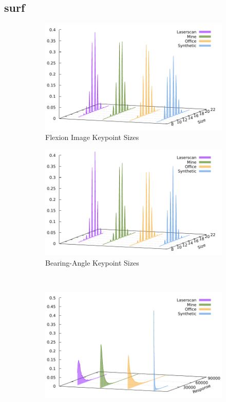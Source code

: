 \subsection{\acrshort{surf}}
\begin{figure}[H]
\begin{subfigure}[t]{0.45\linewidth}
    \includegraphics[width=\linewidth]{chapter06/results/SURF/flexion/size.pdf}%
    \caption{Flexion Image Keypoint Sizes}
\end{subfigure}\quad
\begin{subfigure}[t]{0.45\linewidth}
    \includegraphics[width=\linewidth]{chapter06/results/SURF/bearing/size.pdf}
    \caption{Bearing-Angle Keypoint Sizes}
\end{subfigure}\\
\begin{subfigure}[t]{0.45\linewidth}
    \includegraphics[width=\linewidth]{chapter06/results/SURF/flexion/response.pdf}%

\end{subfigure}
\end{figure}
